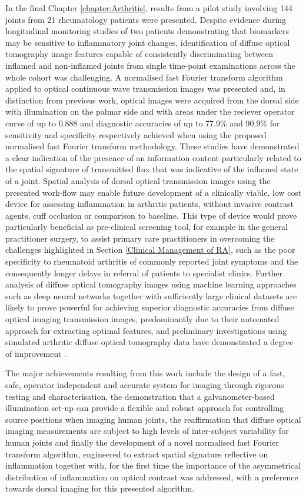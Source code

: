 \documentclass[twoside]{bhamthesis}
\theoremstyle{definition}
\begin{document}
In the final Chapter \ref{chapter:Arthritis}, results from a pilot study involving 144 joints from 21 rheumatology patients were presented. Despite evidence during longitudinal monitoring studies of two patients demonstrating that biomarkers may be sensitive to inflammatory joint changes, identification of diffuse optical tomography image features capable of consistently discriminating between inflamed and non-inflamed joints from single time-point examinations across the whole cohort was challenging. A normalised fast Fourier transform algorithm applied to optical continuous wave transmission images was presented and, in distinction from previous work, optical images were acquired from the dorsal side with illumination on the palmar side and with areas under the reciever operator curve of up to 0.888 and diagnostic accuracies of up to 77.9\% and 90.9\% for sensitivity and specificity respectively achieved when using the proposed normalised fast Fourier transform methodology. These studies have demonstrated a clear indication of the presence of an information content particularly related to the spatial signature of transmitted flux that was indicative of the inflamed state of a joint. Spatial analysis of dorsal optical transmission images using the presented work-flow may enable future development of a clinically viable, low cost device for assessing inflammation in arthritis patients, without invasive contrast agents, cuff occlusion or comparison to baseline. This type of device would prove particularly beneficial as pre-clinical screening tool, for example in the general practitioner surgery, to assist primary care practitioners in overcoming the challenges highlighted in Section \ref{Clinical Management of RA}, such as the poor specificity to rheumatoid arthritis of commonly reported joint symptoms and the consequently longer delays in referral of patients to specialist clinics. Further analysis of diffuse optical tomography images using machine learning approaches such as deep neural networks together with sufficiently large clinical datasets are likely to prove powerful for achieving superior diagnostic accuracies from diffuse optical imaging transmission images, predominantly due to their automated approach for extracting optimal features, and preliminary investigations using simulated arthritic diffuse optical tomography data have demonstrated a degree of improvement \cite{dehghani2019deep}. 

The major achievements resulting from this work include the design of a fast, safe, operator independent and accurate system for imaging through rigorous testing and characterisation, the demonstration that a galvanometer-based illumination set-up can provide a flexible and robust approach for controlling source positions when imaging human joints, the reaffirmation that diffuse optical imaging measurements are subject to high levels of inter-subject variability for human joints and finally the development of a novel normalised fast Fourier transform algorithm, engineered to extract spatial signature reflective on inflammation together with, for the first time the importance of the asymmetrical distribution of inflammation on optical contrast was addressed, with a preference towards dorsal imaging for this presented algorithm. 
\end{document}
